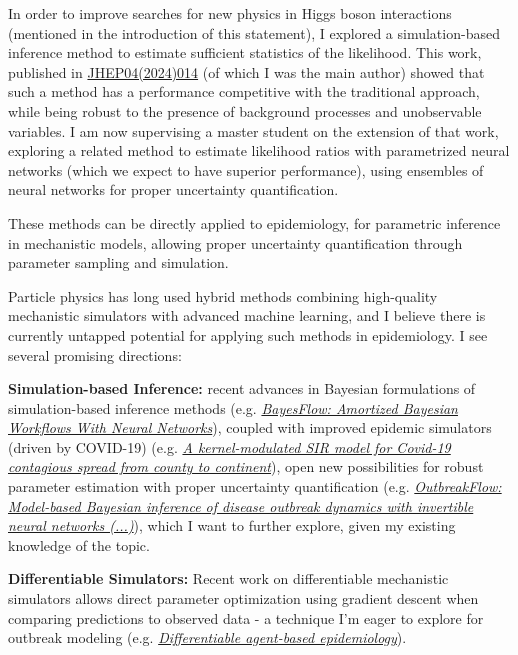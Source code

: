 \documentclass[11pt, a4paper]{awesome-cv}
\begin{document}
\begin{cvletter}
In order to improve searches for new physics in Higgs boson interactions (mentioned in the introduction of this statement), I explored a simulation-based inference method to estimate sufficient statistics of the likelihood. This work, published in \href{http://dx.doi.org/10.1007/JHEP04(2024)014}{JHEP04(2024)014} (of which I was the main author) showed that such a method has a performance competitive with the traditional approach, while being robust to the presence of background processes and unobservable variables. I am now supervising a master student on the extension of that work, exploring a related method to estimate likelihood ratios with parametrized neural networks (which we expect to have superior performance), using ensembles of neural networks for proper uncertainty quantification. 

These methods can be directly applied to epidemiology, for parametric inference in mechanistic models, allowing proper uncertainty quantification through parameter sampling and simulation.


Particle physics has long used hybrid methods combining high-quality mechanistic simulators with advanced machine learning, and I believe there is currently untapped potential for applying such methods in epidemiology. I see several promising directions:

\textbf{Simulation-based Inference:} recent advances in Bayesian formulations of simulation-based inference methods (e.g. \href{https://arxiv.org/abs/2306.16015}{\textit{BayesFlow: Amortized Bayesian Workflows With Neural Networks}}), coupled with improved epidemic simulators (driven by COVID-19) (e.g. \href{https://pubmed.ncbi.nlm.nih.gov/33958443/}{\textit{A kernel-modulated SIR model for Covid-19 contagious spread from county to continent}}), open new possibilities for robust parameter estimation with proper uncertainty quantification (e.g. \href{https://journals.plos.org/ploscompbiol/article?id=10.1371/journal.pcbi.1009472}{\textit{OutbreakFlow: Model-based Bayesian inference of disease outbreak dynamics with invertible neural networks (...)}}), which I want to further explore, given my existing knowledge of the topic.
  
\textbf{Differentiable Simulators:} Recent work on differentiable mechanistic simulators allows direct parameter optimization using gradient descent when comparing predictions to observed data - a technique I'm eager to explore for outbreak modeling (e.g. \href{https://dl.acm.org/doi/abs/10.5555/3545946.3598851}{\textit{Differentiable agent-based epidemiology}}).


\end{cvletter}
\end{document}
